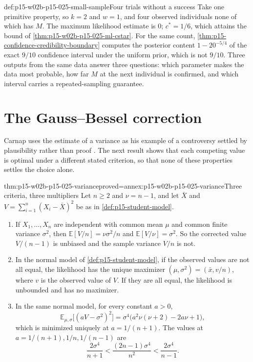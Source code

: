 \begin{hbexample}{def:p15-w02b-p15-025-small-sample}{Four trials without a success}
Take one primitive property, so \(k=2\) and \(w=1\), and four observed
individuals none of which has \(M\). The maximum likelihood estimate is
\(0\); \(c^*=1/6\), which attains the bound of
\cref{thm:p15-w02b-p15-025-ml-cstar}. For the same count,
\cref{thm:p15-confidence-credibility-boundary} computes the posterior
content \(1-20^{-5/4}\) of the exact \(9/10\) confidence interval under
the uniform prior, which is not \(9/10\). Three outputs from the same
data answer three questions: which parameter makes the data most
probable, how far \(M\) at the next individual is confirmed, and which
interval carries a repeated-sampling guarantee.
\end{hbexample}

\section{The Gauss--Bessel correction}
\label{sec:p15-w02b-p15-025-variance}

Carnap uses the estimate of a variance as his example of a controversy
settled by plausibility rather than proof
\cite[sec.~98, pp.~513--514]{Carnap1950Probability}. The next result
shows that each competing value is optimal under a different stated
criterion, so that none of these properties settles the choice alone.

\begin{hbtheorem}{thm:p15-w02b-p15-025-variance}{proved=annex:p15-w02b-p15-025-variance}{Three criteria, three multipliers}
Let \(n\ge2\) and \(\nu=n-1\), and let \(\bar X\) and
\(V=\sum_{i=1}^n(X_i-\bar X)^2\) be as in \cref{def:p15-student-model}.
\begin{enumerate}
\item If \(X_1,\ldots,X_n\) are independent with common mean \(\mu\)
and common finite variance \(\sigma^2\), then
\(\mathbb E[V/n]=\nu\sigma^2/n\) and \(\mathbb E[V/\nu]=\sigma^2\).
So the corrected value \(V/(n-1)\) is unbiased and the sample variance
\(V/n\) is not.
\item In the normal model of \cref{def:p15-student-model}, if the
observed values are not all equal, the likelihood has the unique
maximizer \((\mu,\sigma^2)=(\bar x,v/n)\), where \(v\) is the observed
value of \(V\). If they are all equal, the likelihood is unbounded and
has no maximizer.
\item In the same normal model, for every constant \(a>0\),
\[
 \mathbb E_{\mu,\sigma}\bigl[(aV-\sigma^2)^2\bigr]
 =\sigma^4\bigl(a^2\nu(\nu+2)-2a\nu+1\bigr),
\]
which is minimized uniquely at \(a=1/(n+1)\). The values at
\(a=1/(n+1),1/n,1/(n-1)\) are
\[
 \frac{2\sigma^4}{n+1}<\frac{(2n-1)\sigma^4}{n^2}<\frac{2\sigma^4}{n-1}.
\]
\end{enumerate}
\end{hbtheorem}

